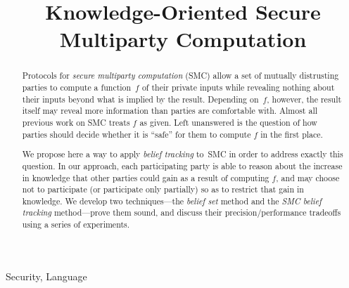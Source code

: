 \documentclass[10pt]{sigplanconf}
\title{Knowledge-Oriented Secure Multiparty Computation}
\begin{document}
\maketitle

\begin{abstract}
Protocols for \emph{secure multiparty computation} (SMC) allow a set
of mutually distrusting parties to compute a function~$f$ of their
private inputs while revealing nothing about their inputs beyond what
is implied by the result.  Depending on~$f$, however, the result
itself may reveal more information than parties are comfortable with.
Almost all previous work on SMC treats $f$ as given.  Left unanswered
is the question of how parties should decide whether it is ``safe''
for them to compute $f$ in the first place.

We propose here a way to apply \emph{belief tracking} to~SMC in order
to address exactly this question. In our approach, each participating
party is able to reason about the increase in knowledge that other
parties could gain as a result of computing $f$, and may choose not to
participate (or participate only partially) so as to restrict that
gain in knowledge.  We develop two techniques---the \emph{belief set}
method and the \emph{SMC belief tracking} method---prove them sound,
and discuss their precision/performance tradeoffs using a series of
experiments.
\end{abstract}

\terms Security, Language
\end{document}
